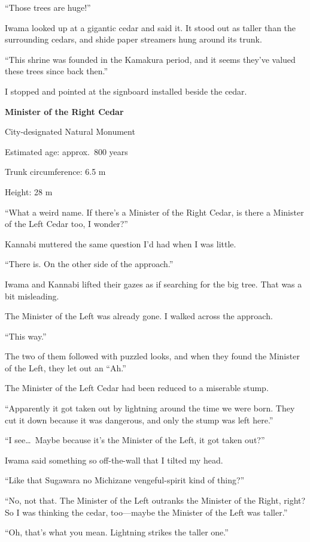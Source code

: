 \documentclass[
    a4paper,
    12pt,
    twoside,
    openany,
    UTF8,
    fontset=windows
]{ctexbook}
\begin{document}
``Those trees are huge!''

Iwama looked up at a gigantic cedar and said it. It stood out as taller than the surrounding cedars, and shide paper streamers hung around its trunk.

``This shrine was founded in the Kamakura period, and it seems they've valued these trees since back then.''

I stopped and pointed at the signboard installed beside the cedar.

\begin{center}
{\bfseries
Minister of the Right Cedar

City-designated Natural Monument

Estimated age: approx.\ 800 years

Trunk circumference: 6.5 m

Height: 28 m
}
\end{center}
``What a weird name. If there's a Minister of the Right Cedar, is there a Minister of the Left Cedar too, I wonder?''

Kannabi muttered the same question I'd had when I was little.

``There is. On the other side of the approach.''

Iwama and Kannabi lifted their gazes as if searching for the big tree. That was a bit misleading.

The Minister of the Left was already gone. I walked across the approach.

``This way.''

The two of them followed with puzzled looks, and when they found the Minister of the Left, they let out an ``Ah.''

The Minister of the Left Cedar had been reduced to a miserable stump.

``Apparently it got taken out by lightning around the time we were born. They cut it down because it was dangerous, and only the stump was left here.''

``I see\dots\ Maybe because it's the Minister of the Left, it got taken out?''

Iwama said something so off-the-wall that I tilted my head.

``Like that Sugawara no Michizane vengeful-spirit kind of thing?''

``No, not that. The Minister of the Left outranks the Minister of the Right, right? So I was thinking the cedar, too---maybe the Minister of the Left was taller.''

``Oh, that's what you mean. Lightning strikes the taller one.''
\end{document}
